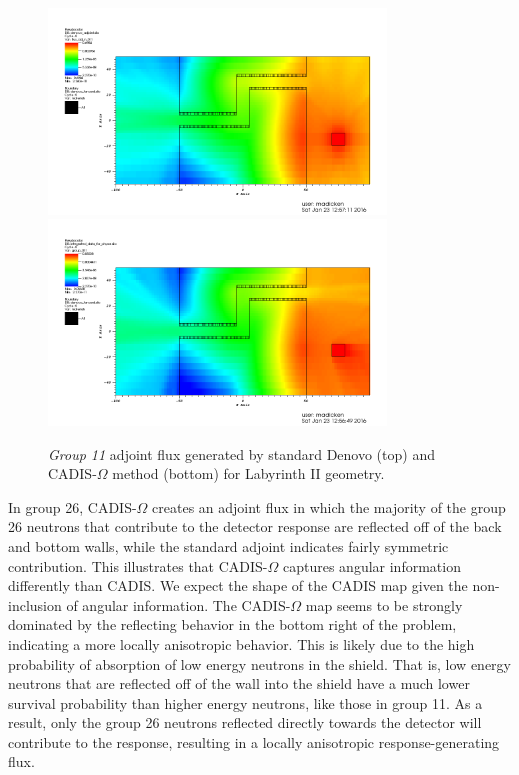 \documentclass[12pt]{article}
\begin{document}
\begin{figure}
  \begin{center}
    \includegraphics[width=0.80\textwidth]{./images/maze2_adjoint_group11_adjusted.png}
    \includegraphics[width=0.80\textwidth]{./images/maze2_myflux_group11_adjusted.png}
    \caption[]{\label{fig::adjoint_fluxes_group11}\textit{Group 11} adjoint flux generated by standard Denovo (top) and CADIS-$\Omega$ method (bottom) for Labyrinth II geometry.}
  \end{center}
\end{figure}

In group 26, CADIS-$\Omega$ creates an adjoint flux in which the majority of the group 26 neutrons that contribute to the detector response are reflected off of the back and bottom walls, while the standard adjoint indicates fairly symmetric contribution. 
This illustrates that CADIS-$\Omega$ captures angular information differently than CADIS. 
We expect the shape of the CADIS map given the non-inclusion of angular information. 
The CADIS-$\Omega$ map seems to be strongly dominated by the reflecting behavior in the bottom right of the problem, indicating a more locally anisotropic behavior. This is likely due to the high probability of absorption of low energy neutrons in the shield. That is, low energy neutrons that are reflected off of the wall into the shield have a much lower survival probability than higher energy neutrons, like those in group 11. As a result, only the group 26 neutrons reflected directly towards the detector will contribute to the response, resulting in a locally anisotropic response-generating flux. 
\end{document}
